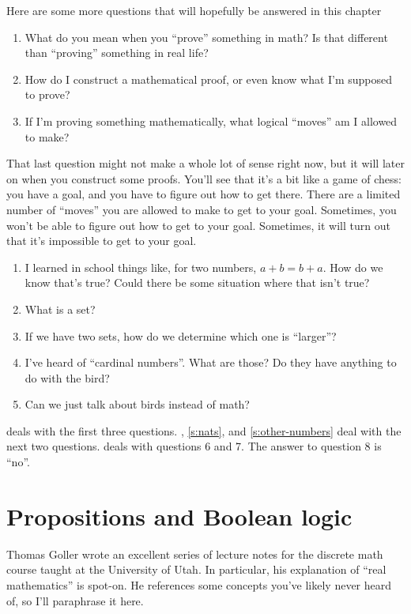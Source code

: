 Here are some more questions that will hopefully be answered in this
chapter

\begin{enumerate}
\item What do you mean when you ``prove'' something in math? Is that
  different than ``proving'' something in real life?
\item How do I construct a mathematical proof, or even know what I'm
  supposed to prove?
\item If I'm proving something mathematically, what logical ``moves''
  am I allowed to make?
\end{enumerate}

That last question might not make a whole lot of sense right now, but
it will later on when you construct some proofs. You'll see that it's
a bit like a game of chess: you have a goal, and you have to figure
out how to get there. There are a limited number of ``moves'' you are
allowed to make to get to your goal. Sometimes, you won't be able to
figure out how to get to your goal. Sometimes, it will turn out that
it's impossible to get to your goal.

\begin{enumerate}[start=4]
\item I learned in school things like, for two numbers,
  $a + b = b + a$. How do we know that's true? Could there be some
  situation where that isn't true?
\item What is a set?
\item If we have two sets, how do we determine which one is
  ``larger''?
\item I've heard of ``cardinal numbers''. What are those? Do they have
  anything to do with the bird?
\item Can we just talk about birds instead of math?
\end{enumerate}

 deals with the first three
questions. , \cref{s:nats}, and \cref{s:other-numbers}
deal with the next two questions.  deals with
questions 6 and 7. The answer to question 8 is ``no''.

\section{Propositions and Boolean logic}
\label{s:props-proofs}
\label{props-proofs}
\label{s:logic}
\label{logic}

Thomas Goller wrote an excellent series of lecture notes for the
discrete math course taught at the University of
Utah. \cite{goller-discrete} In particular, his explanation of ``real
mathematics'' is spot-on. He references some concepts you've likely
never heard of, so I'll paraphrase it here.

